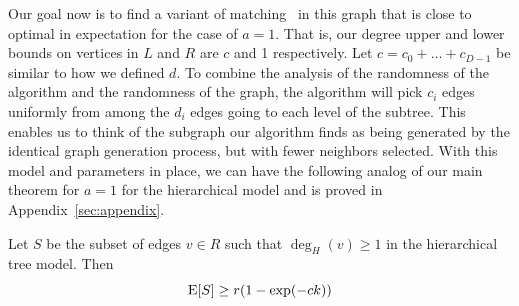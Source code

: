 Our goal now is to find a variant of matching~\cite{Gabow1983} in this
graph that is close to optimal in expectation for the case of $a=1$. That is, our degree
upper and lower bounds on vertices in $L$ and $R$ are $c$ and 1
respectively. Let $c = c_0 + \ldots + c_{D-1}$ be similar to how we
defined $d$.  To combine the analysis of the randomness of the
algorithm and the randomness of the graph, the algorithm will pick
$c_{i}$ edges uniformly from among the $d_{i}$ edges going to each
level of the subtree. This enables us to think of the subgraph our
algorithm finds as being generated by the identical graph generation
process, but with fewer neighbors selected. With this model and
parameters in place, we can have the following analog of our main
theorem for $a=1$ for the hierarchical model and is proved in Appendix~\ref{sec:appendix}.

\begin{thm}
Let $S$ be the subset of edges $v\in R$ such that $\deg_H(v) \geq 1$ in the hierarchical tree model. Then
\[ \text{E}[S] \geq r(1-\exp(-ck)) \]
\end{thm}

%
%

